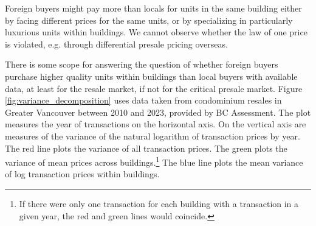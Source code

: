 \documentclass[12pt]{article}
\begin{document}
Foreign buyers might pay more than locals for units in the same building either
by facing different prices for the same units, or by specializing in
particularly luxurious units within buildings. We cannot observe whether the
law of one price is violated, e.g.  through differential presale pricing
overseas.

There is some scope for answering the question of whether foreign buyers purchase higher quality units within
buildings than local buyers with available data, at least for the resale
market, if not for the critical presale market. Figure
\ref{fig:variance_decomposition} uses data taken from condominium resales in
Greater Vancouver between 2010 and 2023, provided by BC Assessment.
The plot measures the year of transactions on the horizontal axis. On the
vertical axis are measures of the variance of the natural logarithm of
transaction prices by year. The red line plots the variance of all transaction
prices. The green plots the variance of mean prices across
buildings.\footnote{If there were only one transaction for each building with a
transaction in a given year, the red and green lines would coincide.} The blue
line plots the mean variance of log transaction prices within buildings. 
\end{document}
